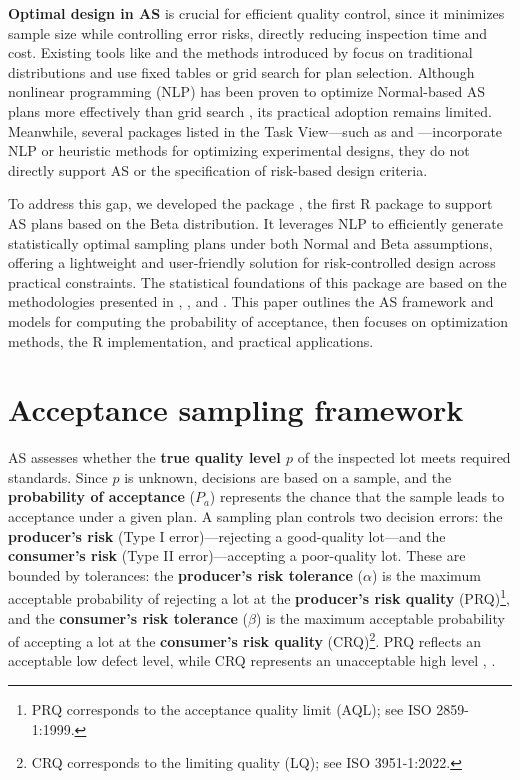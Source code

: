 \textbf{Optimal design in AS} is crucial for efficient quality control, since it
minimizes sample size while controlling error risks, directly reducing inspection
time and cost. Existing tools like 
\citep{kiermeier2008visualizing} and the methods introduced by \citet{cano2015quality} focus
on traditional distributions and use fixed tables or grid search for plan selection.
Although nonlinear programming (NLP) has been proven to optimize Normal-based AS
plans more effectively than grid search \citep{duarte2013optimal}, its practical
adoption remains limited. Meanwhile, several packages listed in the
 Task View---such as 
\citep{OptimalDesign} and  \citep{AlgDesign}---incorporate NLP or heuristic
methods for optimizing experimental designs, they do not directly support AS or
the specification of risk-based design criteria.

To address this gap, we developed the  package
\citep{AccSamplingDesign}, the first R package to support AS plans based on the Beta
distribution. It leverages NLP to efficiently generate statistically optimal
sampling plans under both Normal and Beta assumptions, offering a lightweight and
user-friendly solution for risk-controlled design across practical constraints.
The statistical foundations of this package are based on the methodologies
presented in \citet{schilling2012acceptance}, \citet{wilrich2004single}, and
\citet{govindaraju2015sampling}. This paper outlines the AS framework and models for
computing the probability of acceptance, then focuses on optimization methods,
the R implementation, and practical applications.

\section{Acceptance sampling framework}\label{sec:as_framework}

AS assesses whether the \textbf{true quality level \(p\)} of the inspected lot
meets required standards. Since \(p\) is unknown, decisions are based on a sample,
and the \textbf{probability of acceptance} (\(P_a\)) represents the chance that the
sample leads to acceptance under a given plan. A sampling plan controls two
decision errors: the \textbf{producer's risk} (Type I error)---rejecting a
good-quality lot---and the \textbf{consumer's risk} (Type II error)---accepting a
poor-quality lot. These are bounded by tolerances: the
\textbf{producer's risk tolerance} (\(\alpha\)) is the maximum acceptable
probability of rejecting a lot at the
\textbf{producer's risk quality} (PRQ)\footnote{PRQ corresponds to the acceptance 
quality limit (AQL); see ISO 2859-1:1999.}, and the \textbf{consumer's risk tolerance}
(\(\beta\)) is the maximum acceptable probability of accepting a lot at the
\textbf{consumer's risk quality} (CRQ)\footnote{CRQ corresponds to the limiting 
quality (LQ); see ISO 3951-1:2022.}. PRQ reflects an acceptable low defect level,
while CRQ represents an unacceptable high level \citep{ISO3534-2}, \citep{CXG50-2004}.

